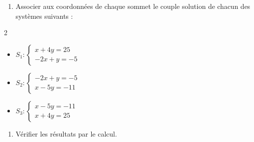 \begin{exo}{}
	\begin{enumerate}
		\item Associer aux coordonnées de chaque sommet le couple solution de chacun des systèmes suivants :
	\end{enumerate}
	\vspace*{-2mm}
	\begin{multicols}{2}
	\begin{itemize}
		\item $S_1 : \begin{cases} x + 4y = 25 \\ -2x + y = -5 \end{cases}$
		\item $S_2 : \begin{cases} -2x + y = -5 \\ x - 5y = -11 \end{cases}$
		\item $S_3 : \begin{cases} x - 5y = -11 \\ x + 4y = 25 \end{cases}$
	\end{itemize}
	\end{multicols}
	\begin{enumerate}[resume]
		\item Vérifier les résultats par le calcul.
	\end{enumerate}
\end{exo}
